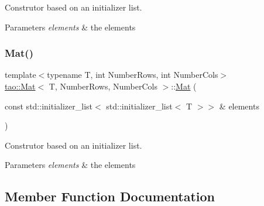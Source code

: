 Construtor based on an initializer list. 


\begin{DoxyParams}{Parameters}
{\em elements} & the elements \\
\hline
\end{DoxyParams}
\mbox{\label{classtao_1_1_mat_a4e3a587a2d6466f391c4163dac1ddf24}} 
\subsubsection{\texorpdfstring{Mat()}{Mat()}\hspace{0.1cm}{\footnotesize\ttfamily [3/3]}}
{\footnotesize\ttfamily template$<$typename T, int Number\+Rows, int Number\+Cols$>$ \\
\mbox{\hyperlink{classtao_1_1_mat}{tao\+::\+Mat}}$<$ T, Number\+Rows, Number\+Cols $>$\+::\mbox{\hyperlink{classtao_1_1_mat}{Mat}} (\begin{DoxyParamCaption}\item[{const std\+::initializer\+\_\+list$<$ std\+::initializer\+\_\+list$<$ T $>$$>$ \&}]{elements }\end{DoxyParamCaption})\hspace{0.3cm}{\ttfamily [inline]}}



Construtor based on an initializer list. 


\begin{DoxyParams}{Parameters}
{\em elements} & the elements \\
\hline
\end{DoxyParams}


\subsection{Member Function Documentation}
\mbox{\label{classtao_1_1_mat_a478949f4c6c7082ea0bfc78bf5d46b74}} 
